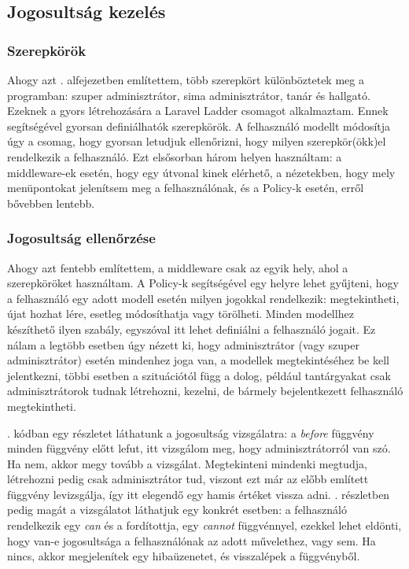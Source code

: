 \documentclass[
]{thesis-ekf}
\theoremstyle{definition}
\theoremstyle{remark}
\begin{document}
\subsection{Jogosultság kezelés}

\subsubsection{Szerepkörök}

Ahogy azt . alfejezetben említettem, több szerepkört különböztetek meg a programban: szuper adminisztrátor, sima adminisztrátor, tanár és hallgató. Ezeknek a gyors létrehozására a Laravel Ladder\cite{ladder} csomagot alkalmaztam. Ennek segítségével gyorsan definiálhatók szerepkörök. A felhasználó modellt módosítja úgy a csomag, hogy gyorsan letudjuk ellenőrizni, hogy milyen szerepkör(ökk)el rendelkezik a felhasználó. Ezt elsősorban három helyen használtam: a middleware-ek esetén, hogy egy útvonal kinek elérhető, a nézetekben, hogy mely menüpontokat jelenítsem meg a felhasználónak, és a Policy-k esetén, erről bővebben lentebb.



\subsubsection{Jogosultság ellenőrzése}

Ahogy azt fentebb említettem, a middleware csak az egyik hely, ahol a szerepköröket használtam. A Policy-k\cite{policies} segítségével egy helyre lehet gyűjteni, hogy a felhasználó egy adott modell esetén milyen jogokkal rendelkezik: megtekintheti, újat hozhat lére, esetleg módosíthatja vagy törölheti. Minden modellhez készíthető ilyen szabály, egyszóval itt lehet definiálni a felhasználó jogait. Ez nálam a legtöbb esetben úgy nézett ki, hogy adminisztrátor (vagy szuper adminisztrátor) esetén mindenhez joga van, a modellek megtekintéséhez be kell jelentkezni, többi esetben a szituációtól függ a dolog, például tantárgyakat csak adminisztrátorok tudnak létrehozni, kezelni, de bármely bejelentkezett felhasználó megtekintheti.

. kódban egy részletet láthatunk a jogosultság vizsgálatra: a \emph{before} függvény minden függvény előtt lefut, itt vizsgálom meg, hogy adminisztrátorról van szó. Ha nem, akkor megy tovább a vizsgálat. Megtekinteni mindenki megtudja, létrehozni pedig csak adminisztrátor tud, viszont ezt már az előbb említett függvény levizsgálja, így itt elegendő egy hamis értéket vissza adni. . részletben pedig magát a vizsgálatot láthatjuk egy konkrét esetben: a felhasználó rendelkezik egy \emph{can} és a fordítottja, egy \emph{cannot} függvénnyel, ezekkel lehet eldönti, hogy van-e jogosultsága a felhasználónak az adott művelethez, vagy sem. Ha nincs, akkor megjelenítek egy hibaüzenetet, és visszalépek a függvényből.
\pagebreak
\end{document}

